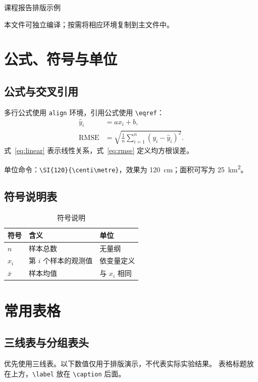 \documentclass[UTF8,a4paper,zihao=-4,fontset=fandol]{ctexart}
\begin{document}
\begin{center}
  {\heiti{}课程报告排版示例\par}
  \vspace{0.5em}
  本文件可独立编译；按需将相应环境复制到主文件中。
\end{center}

\section{公式、符号与单位}
\subsection{公式与交叉引用}
多行公式使用 \texttt{align} 环境，引用公式使用 \verb|\eqref|：
\begin{align}
  \hat{y}_i &= a x_i + b,\label{eq:linear}\\
  \operatorname{RMSE} &= \sqrt{\frac{1}{n}\sum_{i=1}^{n}(y_i-\hat{y}_i)^2}.
  \label{eq:rmse}
\end{align}
式~\eqref{eq:linear} 表示线性关系，式~\eqref{eq:rmse} 定义均方根误差。

单位命令：\verb|\SI{120}{\centi\metre}|，效果为
\SI{120}{\centi\metre}；面积可写为 \SI{25}{\square\kilo\metre}。

\subsection{符号说明表}
\begin{table}[htbp]
  \centering
  \caption{符号说明}
  \label{tab:symbols}
  \begin{tabularx}{0.9\linewidth}{|P{1.8cm}|L|P{2.2cm}|}
    \hline
    符号 & 含义 & 单位 \\
    \hline
    $n$ & 样本总数 & 无量纲 \\
    \hline
    $x_i$ & 第 $i$ 个样本的观测值 & 依变量定义 \\
    \hline
    $\bar{x}$ & 样本均值 & 与 $x_i$ 相同 \\
    \hline
  \end{tabularx}
\end{table}

\clearpage
\section{常用表格}
\subsection{三线表与分组表头}
优先使用三线表。以下数值仅用于排版演示，不代表实际实验结果。
表格标题放在上方，\verb|\label| 放在 \verb|\caption| 后面。
\end{document}
